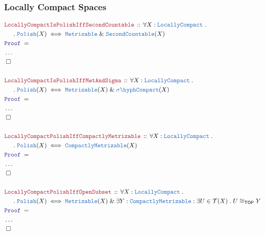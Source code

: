 \documentclass[12pt]{scrartcl}
\newcommand{\TYPE}[1]{\textcolor{NavyBlue}{\mathtt{#1}}}
\newcommand{\LOGIC}[1]{\textcolor{Blue}{\mathtt{#1}}}
\newcommand{\THM}[1]{\textcolor{Maroon}{\mathtt{#1}}}
\renewcommand{\.}{\; . \;}
\newcommand{\Theorem}[2]{& \THM{#1} \, :: \, #2 \\ & \Proof = \\ }
\newcommand{\NewLine}{\\ & \kern 1pc}
\newcommand{\Page}[1]{ \begin{align*} #1 \end{align*}   }
\newcommand{\NoProof}{ & \ldots \\ \EndProof}
\renewcommand{\And}{\; \& \;}
\newcommand{\QED}{\; \square}
\newcommand{\EndProof}{& \QED \\}
\newcommand{\Proof}{\LOGIC{Proof} \; }
\newcommand{\SCompact}{\TYPE{\sigma\hyph Compact}}
\newcommand{\LCompact}{\TYPE{LocallyCompact}}
\newcommand{\TOP}{\mathsf{TOP}}
\newcommand{\T}{\mathcal{T}}
\newcommand{\Polish}{\TYPE{Polish}}
\begin{document}
\subsubsection{Locally Compact Spaces}
\Page{
	\Theorem{LocallyCompactIsPolishIffSecondCountable}
	{
		\forall X : \LCompact \. \NewLine \. 
		\Polish(X) \iff \TYPE{Metrizable} \And \TYPE{SecondCountable}(X)
	}
	\NoProof
	\\
	\Theorem{LocallyCompactIsPolishIffMetAndSigma}
	{
		\forall X : \LCompact \. \NewLine \.
		\Polish(X) \iff \TYPE{Metrizable}(X) \And \SCompact(X)
	}
	\NoProof
	\\
	\Theorem{LocallyCompactPolishIffCompactlyMetrizable}
	{
		\forall X : \LCompact \. \NewLine \.
		\Polish(X) \iff \TYPE{CompactlyMetrizable}(X)
	}
	\NoProof
	\\
	\Theorem{LocallyCompactPolishIffOpenSubset}
	{
		\forall X : \LCompact \. \NewLine \.
		\Polish(X) \iff \TYPE{Metrizable}(X) \And 
		\exists Y : \TYPE{CompactlyMetrizable} :
		\exists U \in \T(X) \.
		U \cong_\TOP Y
	}
	\NoProof
}
\newpage
\end{document}
